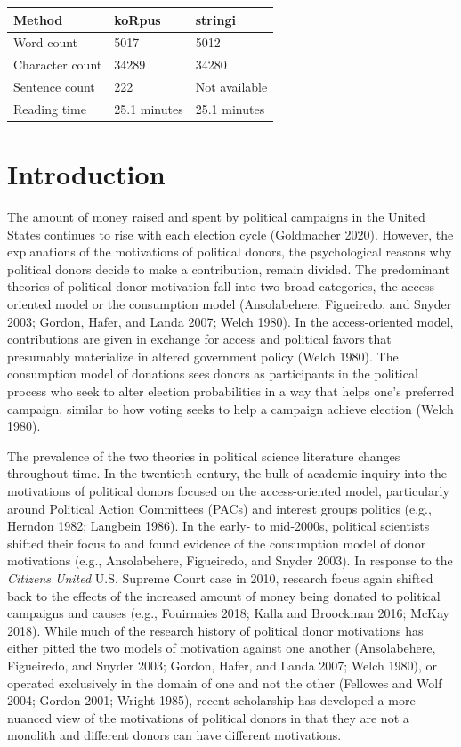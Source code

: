 \documentclass[12pt,]{article}
\begin{document}
\vskip -8.5pt



\noindent \doublespacing 

\begin{longtable}[]{@{}lll@{}}
\toprule
Method & koRpus & stringi\tabularnewline
\midrule
\endhead
Word count & 5017 & 5012\tabularnewline
Character count & 34289 & 34280\tabularnewline
Sentence count & 222 & Not available\tabularnewline
Reading time & 25.1 minutes & 25.1 minutes\tabularnewline
\bottomrule
\end{longtable}

\newpage

\hypertarget{introduction}{%
\section{Introduction}\label{introduction}}

The amount of money raised and spent by political campaigns in the
United States continues to rise with each election cycle (Goldmacher
2020). However, the explanations of the motivations of political donors,
the psychological reasons why political donors decide to make a
contribution, remain divided. The predominant theories of political
donor motivation fall into two broad categories, the access-oriented
model or the consumption model (Ansolabehere, Figueiredo, and Snyder
2003; Gordon, Hafer, and Landa 2007; Welch 1980). In the access-oriented
model, contributions are given in exchange for access and political
favors that presumably materialize in altered government policy (Welch
1980). The consumption model of donations sees donors as participants in
the political process who seek to alter election probabilities in a way
that helps one's preferred campaign, similar to how voting seeks to help
a campaign achieve election (Welch 1980).

The prevalence of the two theories in political science literature
changes throughout time. In the twentieth century, the bulk of academic
inquiry into the motivations of political donors focused on the
access-oriented model, particularly around Political Action Committees
(PACs) and interest groups politics (e.g., Herndon 1982; Langbein 1986).
In the early- to mid-2000s, political scientists shifted their focus to
and found evidence of the consumption model of donor motivations (e.g.,
Ansolabehere, Figueiredo, and Snyder 2003). In response to the
\emph{Citizens United} U.S. Supreme Court case in 2010, research focus
again shifted back to the effects of the increased amount of money being
donated to political campaigns and causes (e.g., Fouirnaies 2018; Kalla
and Broockman 2016; McKay 2018). While much of the research history of
political donor motivations has either pitted the two models of
motivation against one another (Ansolabehere, Figueiredo, and Snyder
2003; Gordon, Hafer, and Landa 2007; Welch 1980), or operated
exclusively in the domain of one and not the other (Fellowes and Wolf
2004; Gordon 2001; Wright 1985), recent scholarship has developed a more
nuanced view of the motivations of political donors in that they are not
a monolith and different donors can have different motivations.
\end{document}
